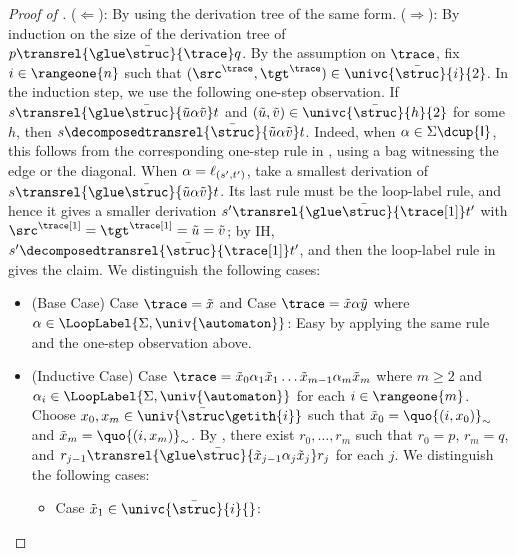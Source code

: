 \documentclass[a4paper,UKenglish,cleveref, autoref, thm-restate]{lipics-v2021}
\DeclarePairedDelimiter\set{\{}{\}}
\DeclarePairedDelimiter\tuple{(}{)}
\newcommand{\const}[1]{\mathsf{#1}}
\newcommand{\mul}[1]{\bar{#1}}
\newcommand{\id}{\const{I}}
\begin{document}
\begin{proof}[Proof of ]
    ($\Longleftarrow$):
    By using the derivation tree of the same form.
    ($\Longrightarrow$):
    By induction on the size of the derivation tree of $p \transrel{\glue \mul{\struc}}{\trace} q$.
    By the assumption on $\trace$, fix $i \in \rangeone{n}$ such that $\tuple{\src^{\trace}, \tgt^{\trace}} \in \univc{\mul{\struc}}{i}{2}$.
    In the induction step, we use the following one-step observation.
    If $s \transrel{\glue \mul{\struc}}{\tilde{u} \alpha \tilde{v}} t$ and $\tuple{\tilde{u}, \tilde{v}} \in \univc{\mul{\struc}}{h}{2}$ for some $h$,
    then $s \decomposedtransrel{\mul{\struc}}{\tilde{u} \alpha \tilde{v}} t$.
    Indeed, when $\alpha \in \Sigma \dcup \set{\id}$, this follows from the corresponding one-step rule in , using a bag witnessing the edge or the diagonal.
    When $\alpha = \ell_{\tuple{s', t'}}$, take a smallest derivation of $s \transrel{\glue \mul{\struc}}{\tilde{u} \alpha \tilde{v}} t$.
    Its last rule must be the loop-label rule, and hence it gives a smaller derivation
    $s' \transrel{\glue \mul{\struc}}{\trace[1]} t'$ with $\src^{\trace[1]} = \tgt^{\trace[1]} = \tilde{u} = \tilde{v}$;
    by IH, $s' \decomposedtransrel{\mul{\struc}}{\trace[1]} t'$, and then the loop-label rule in  gives the claim.
    We distinguish the following cases:
    \begin{itemize}
        \item (Base Case) Case $\trace = \tilde{x}$ and Case $\trace = \tilde{x} \alpha \tilde{y}$ where $\alpha \in \LoopLabel{\Sigma, \univ{\automaton}}$:
        Easy by applying the same rule and the one-step observation above.
        \item (Inductive Case) Case $\trace = \tilde{x}_0 \alpha_1 \tilde{x}_1 \dots \tilde{x}_{m-1} \alpha_{m} \tilde{x}_{m}$
        where $m \ge 2$ and $\alpha_{i} \in \LoopLabel{\Sigma, \univ{\automaton}}$ for each $i \in \rangeone{m}$.
        Choose $x_0, x_m \in \univ{\mul{\struc}\getith{i}}$ such that
        $\tilde{x}_0 = \quo{\tuple{i, x_0}}_{\sim}$ and $\tilde{x}_m = \quo{\tuple{i, x_m}}_{\sim}$.
        By ,
        there exist $r_0, \dots, r_{m}$ such that
        $r_0 = p$,
        $r_{m} = q$, and
        $r_{j-1} \transrel{\glue \mul{\struc}}{\tilde{x}_{j-1} \alpha_{j} \tilde{x}_{j}} r_{j}$ for each $j$.
        We distinguish the following cases:
        \begin{itemize}
            \item Case $\tilde{x}_1 \in \univc{\mul{\struc}}{i}{}$:

\end{itemize}
\end{itemize}
\end{proof}
\end{document}
